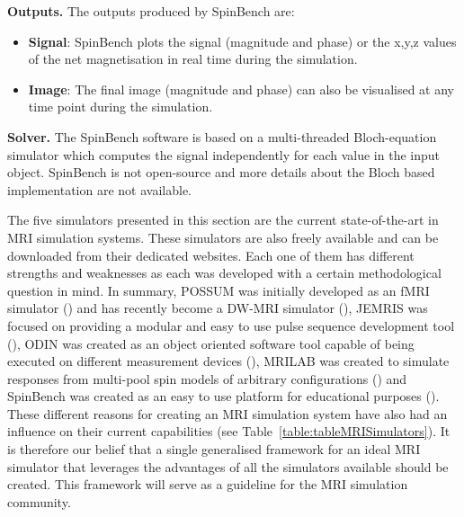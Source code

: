 \hfill

\textbf{Outputs.} The outputs produced by SpinBench are:
\begin{itemize}
    
    \item \textbf{Signal}: SpinBench plots the signal (magnitude and phase) or the x,y,z values of the net magnetisation in real time during the simulation.
    
    \item \textbf{Image}: The final image (magnitude and phase) can also be visualised at any time point during the simulation.
    
\end{itemize}

\hfill

\textbf{Solver.} The SpinBench software is based on a multi-threaded Bloch-equation simulator which computes the signal independently for each value in the input object.
SpinBench is not open-source and more details about the Bloch based implementation are not available.

\hfill

The five simulators presented in this section are the current state-of-the-art in MRI simulation systems.
These simulators are also freely available and can be downloaded from their dedicated websites.
Each one of them has different strengths and weaknesses as each was developed with a certain methodological question in mind.
In summary, 
POSSUM was initially developed as an fMRI simulator (\cite{Drobnjak2006}) and has recently become a DW-MRI simulator (\cite{Graham2016}), 
JEMRIS was focused on providing a modular and easy to use pulse sequence development tool (\cite{Stocker2010}), 
ODIN was created as an object oriented software tool capable of being executed on different measurement devices (\cite{Jochimsen2004}),
MRILAB was created to simulate responses from multi-pool spin models of arbitrary configurations (\cite{Liu2017})
and
SpinBench was created as an easy to use platform for educational purposes (\cite{Overall2007}).
These different reasons for creating an MRI simulation system have also had an influence on their current capabilities (see Table~\ref{table:tableMRISimulators}).
It is therefore our belief that a single generalised framework for an ideal MRI simulator that leverages the advantages of all the simulators available should be created.
This framework will serve as a guideline for the MRI simulation community.



